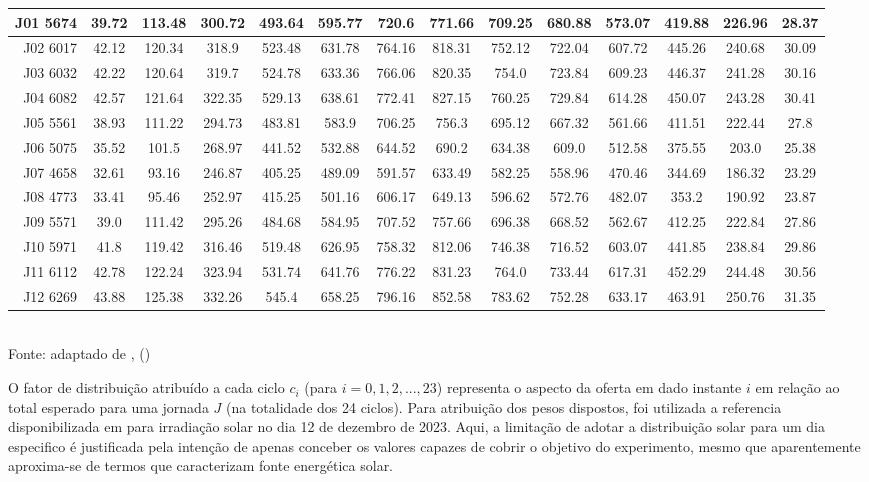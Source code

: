 \begin{table}[h]
\begin{tabular}{ r | *{13}{c} }
	\hline
	J01 5674 & 39.72 & 113.48 & 300.72 & 493.64 & 595.77 & 720.6 & 771.66 & 709.25 & 680.88 & 573.07 & 419.88 & 226.96 & 28.37\\
	\hline
	J02 6017 & 42.12 & 120.34 & 318.9 & 523.48 & 631.78 & 764.16 & 818.31 & 752.12 & 722.04 & 607.72 & 445.26 & 240.68 & 30.09 \\
	\hline
	J03 6032 &  42.22 & 120.64 & 319.7 & 524.78 & 633.36 & 766.06 & 820.35 & 754.0 & 723.84 & 609.23 & 446.37 & 241.28 & 30.16 \\
	\hline
	J04 6082 & 42.57 & 121.64 & 322.35 & 529.13 & 638.61 & 772.41 & 827.15 & 760.25 & 729.84 & 614.28 & 450.07 & 243.28 & 30.41 \\
	\hline
	J05 5561 & 38.93 & 111.22 & 294.73 & 483.81 & 583.9 & 706.25 & 756.3 & 695.12 & 667.32 & 561.66 & 411.51 & 222.44 & 27.8\\
	\hline
	J06 5075 & 35.52 & 101.5 & 268.97 & 441.52 & 532.88 & 644.52 & 690.2 & 634.38 & 609.0 & 512.58 & 375.55 & 203.0 & 25.38 \\
	\hline
	J07 4658 & 32.61 & 93.16 & 246.87 & 405.25 & 489.09 & 591.57 & 633.49 & 582.25 & 558.96 & 470.46 & 344.69 & 186.32 & 23.29 \\
	\hline
	J08 4773 & 33.41 & 95.46 & 252.97 & 415.25 & 501.16 & 606.17 & 649.13 & 596.62 & 572.76 & 482.07 & 353.2 & 190.92 & 23.87\\
	\hline
	J09 5571 & 39.0 & 111.42 & 295.26 & 484.68 & 584.95 & 707.52 & 757.66 & 696.38 & 668.52 & 562.67 & 412.25 & 222.84 & 27.86\\
	\hline
	J10 5971 & 41.8 & 119.42 & 316.46 & 519.48 & 626.95 & 758.32 & 812.06 & 746.38 & 716.52 & 603.07 & 441.85 & 238.84 & 29.86 \\
	\hline
	J11 6112 & 42.78 & 122.24 & 323.94 & 531.74 & 641.76 & 776.22 & 831.23 & 764.0 & 733.44 & 617.31 & 452.29 & 244.48 & 30.56 \\
	\hline
	J12 6269 & 43.88 & 125.38 & 332.26 & 545.4 & 658.25 & 796.16 & 852.58 & 783.62 & 752.28 & 633.17 & 463.91 & 250.76 & 31.35 \\
\bottomrule
\end{tabular}
\label{table:cap6distribuicaonatal}
\\
\footnotesize Fonte: adaptado de \citeauthor{martins2017atlas}, (\citeyear{martins2017atlas})

\end{table}
\endgroup

O fator de distribuição atribuído a cada ciclo $c_i$ (para $i=0,1,2,...,23$) representa o aspecto da oferta em  dado instante $i$ em relação ao total esperado para uma jornada $J$ (na totalidade dos 24 ciclos). Para atribuição dos pesos dispostos, foi utilizada a referencia disponibilizada em  para irradiação solar no dia 12 de dezembro de 2023. Aqui, a limitação de adotar a distribuição solar para um dia especifico é justificada pela intenção de apenas conceber os valores capazes de cobrir o objetivo do experimento, mesmo que aparentemente aproxima-se de termos que caracterizam fonte energética solar. 

